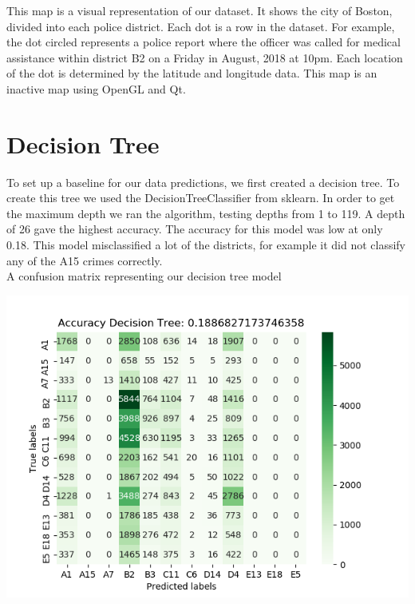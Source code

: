 \documentclass[a0,landscape]{a0poster}
\let\Section=\section
\def\section{\setcounter{equation}{0}\Section}
\newcommand{\1}{\bold{1}}
\begin{document}
\begin{multicols}{3}
\begin{center}
    This map is a visual representation of our dataset. It shows the city of Boston, divided into each police district. Each dot is a row in the dataset. For example, the dot circled represents a police report where the officer was called for medical assistance within district B2 on a Friday in August, 2018 at 10pm. Each location of the dot is determined by the latitude and longitude data. This map is an inactive map using OpenGL and Qt.
\end{center}
\section{Decision Tree}
To set up a baseline for our data predictions, we first created a decision tree. To create this tree we used the DecisionTreeClassifier from sklearn. In order to get the maximum depth we ran the algorithm, testing depths from 1 to 119. A depth of 26 gave the highest accuracy. The accuracy for this model was low at only 0.18. This model misclassified a lot of the districts, for example it did not classify any of the A15 crimes correctly. \\

\centering A confusion matrix representing our decision tree model
\begin{center}
    \includegraphics[scale = 1.75]{decision_tree_cm.png} \\
\end{center}

\end{multicols}
\end{document}
